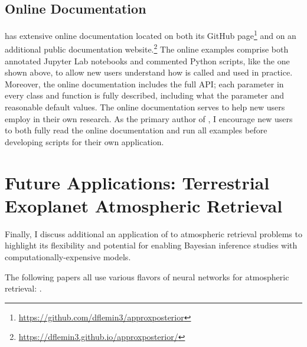 
\subsection{Online Documentation} \label{AP:sec:docs}

\approxposterior has extensive online documentation located on both its GitHub page\footnote{\href{https://github.com/dflemin3/approxposterior}{https://github.com/dflemin3/approxposterior}} and on an additional public documentation website.\footnote{\href{https://dflemin3.github.io/approxposterior/}{https://dflemin3.github.io/approxposterior/}} The online examples comprise both annotated Jupyter Lab notebooks and commented Python scripts, like the one shown above, to allow new users understand how \approxposterior is called and used in practice. Moreover, the online documentation includes the full \approxposterior API; each parameter in every \approxposterior class and function is fully described, including what the parameter and reasonable default values. The online documentation serves to help new users employ \approxposterior in their own research. As the primary author of \approxposterior, I encourage new users to both fully read the online documentation and run all examples before developing scripts for their own application.

\section{Future Applications: Terrestrial Exoplanet Atmospheric Retrieval} \label{AP:sec:future}

Finally, I discuss additional an application of \approxposterior to atmospheric retrieval problems to highlight its flexibility and potential for enabling Bayesian inference studies with computationally-expensive models.

The following papers all use various flavors of neural networks for atmospheric retrieval: \citep{Waldmann2016,MarquezNeila2018,Zingales2018,Cobb2019,Fisher2019,Himes2020}.

